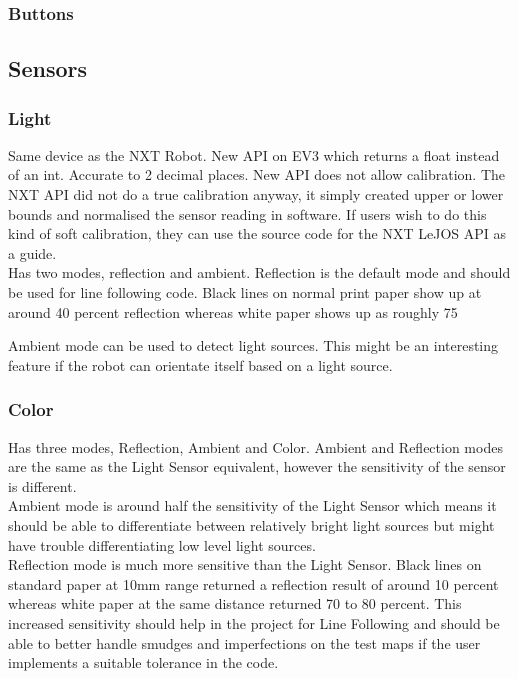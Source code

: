 \documentclass[11pt, a4paper, oneside]{article}
\begin{document}
		\subsubsection{Buttons}


  	\subsection{Sensors}
  		\subsubsection{Light}
  		Same device as the NXT Robot. New API on EV3 which returns a float instead of an int. Accurate to 2 decimal places. New API does not allow calibration. The NXT API did not do a true calibration anyway, it simply created upper or lower bounds and normalised the sensor reading in software. If users wish to do this kind of soft calibration, they can use the source code for the NXT LeJOS API as a guide. \\

  		Has two modes, reflection and ambient. Reflection is the default mode and should be used for line following code. Black lines on normal print paper show up at around 40 percent reflection whereas white paper shows up as roughly 75%

  		Ambient mode can be used to detect light sources. This might be an interesting feature if the robot can orientate itself based on a light source.


  		\subsubsection{Color}
  		Has three modes, Reflection, Ambient and Color. Ambient and Reflection modes are the same as the Light Sensor equivalent, however the sensitivity of the sensor is different. \\

  		Ambient mode is around half the sensitivity of the Light Sensor which means it should be able to differentiate between relatively bright light sources but might have trouble differentiating low level light sources. \\

  		Reflection mode is much more sensitive than the Light Sensor. Black lines on standard paper at 10mm range returned a reflection result of around 10 percent whereas white paper at the same distance returned 70 to 80 percent. This increased sensitivity should help in the project for Line Following and should be able to better handle smudges and imperfections on the test maps if the user implements a suitable tolerance in the code. \\
\end{document}
